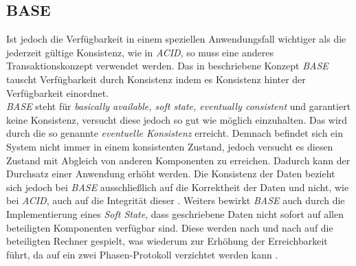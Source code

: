 \subsection{BASE}\label{sec:transactionTheory:base}
Ist jedoch die Verfügbarkeit in einem speziellen Anwendungsfall wichtiger als die jederzeit gültige Konsistenz, wie in \textit{ACID}, so muss eine anderes Transaktionskonzept verwendet werden. Das in \cite{PritchettBASE} beschriebene Konzept \textit{BASE} tauscht Verfügbarkeit durch Konsistenz indem es Konsistenz hinter der Verfügbarkeit einordnet. \\
\textit{BASE} steht für \textit{basically available, soft state, eventually consistent} und garantiert keine Konsistenz, versucht diese jedoch so gut wie möglich einzuhalten. Das wird durch die so genannte \textit{eventuelle Konsistenz} erreicht. Demnach befindet sich ein System nicht immer in einem konsistenten Zustand, jedoch versucht es diesen Zustand mit Abgleich von anderen Komponenten zu erreichen. Dadurch kann der Durchsatz einer Anwendung erhöht werden. Die Konsistenz der Daten bezieht sich jedoch bei \textit{BASE} ausschließlich auf die Korrektheit der Daten und nicht, wie bei \textit{ACID}, auch auf die Integrität dieser \citep{EdlichFriedlandHampeBrauer201010}. Weiters bewirkt \textit{BASE} auch durch die Implementierung eines \textit{Soft State}, dass geschriebene Daten nicht sofort auf allen beteiligten Komponenten verfügbar sind. Diese werden nach und nach auf die beteiligten Rechner gespielt, was wiederum zur Erhöhung der Erreichbarkeit führt, da auf ein zwei Phasen-Protokoll verzichtet werden kann \citep{EdlichFriedlandHampeBrauer201010}.


